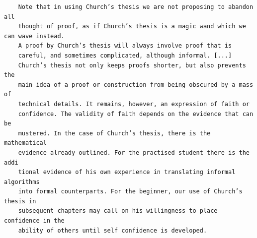 	\begin{verbatim}
	Note that in using Church’s thesis we are not proposing to abandon all
	thought of proof, as if Church’s thesis is a magic wand which we can wave instead. 
	A proof by Church’s thesis will always involve proof that is
	careful, and sometimes complicated, although informal. [...]
	Church’s thesis not only keeps proofs shorter, but also prevents the
	main idea of a proof or construction from being obscured by a mass of
	technical details. It remains, however, an expression of faith or
	confidence. The validity of faith depends on the evidence that can be
	mustered. In the case of Church’s thesis, there is the mathematical
	evidence already outlined. For the practised student there is the addi
	tional evidence of his own experience in translating informal algorithms
	into formal counterparts. For the beginner, our use of Church’s thesis in
	subsequent chapters may call on his willingness to place confidence in the
	ability of others until self confidence is developed.
	\end{verbatim}
	